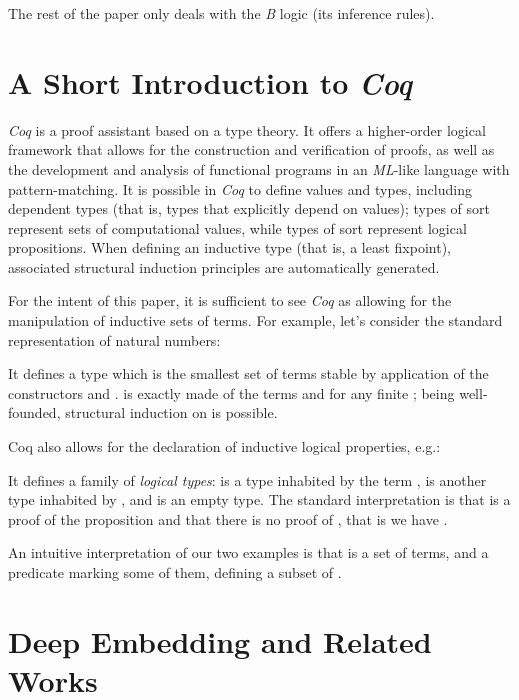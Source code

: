 \documentclass{llncs}
\begin{document}
The rest of the paper only deals with the \emph{B} logic (its inference rules).

\section{A Short Introduction to \emph{Coq}}\label{sc_introcoq}

\emph{Coq} is a proof assistant based on a type theory. It offers a higher-order logical 
framework that allows for the construction and verification of proofs, as well as the
development and analysis of functional programs in an \emph{ML}-like language with 
pattern-matching. It is possible in \emph{Coq} to define values and types, including dependent 
types (that is, types that explicitly depend on values); types of sort  represent 
sets of computational values, while types of sort  represent logical 
propositions. When defining an inductive type (that is, a least fixpoint), associated 
structural induction principles are automatically generated.

For the intent of this paper, it is sufficient to see \emph{Coq} as allowing for the
manipulation of inductive sets of terms. For example, let's consider the standard 
representation of natural numbers:
\begin{example}\small

\end{example}
It defines a type  which is the smallest set of terms stable by application of the 
constructors  and .  is exactly made of the terms  and  for any finite 
; being well-founded, structural induction on  is possible.

Coq also allows for the declaration of inductive logical properties, e.g.:
\begin{example}\small

\end{example}
It defines a family of \emph{logical types}:  is a type inhabited by the term , 
 is another type inhabited by , and  is an empty type. The 
standard interpretation is that  is a proof of the proposition  and that there is 
no proof of , that is we have .

An intuitive interpretation of our two examples is that  is a set of terms, and  a 
predicate marking some of them, defining a subset of .

\section{Deep Embedding and Related Works}\label{sc_relworks}
\end{document}
